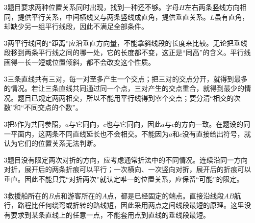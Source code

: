 \documentclass[multi=snippet,border={5bp 20bp 5bp 5bp}]{standalone}
\newenvironment{snippet}[3]{\begin{minipage}{#1bp}\color{answerred}\fontsize{#2}{#3}\selectfont\raggedright}{\end{minipage}}
\begin{document}
\begin{snippet}{505}{11.5}{14}\begin{multicols}{3}\raggedcolumns 题目要求两种位置关系同时出现，找到一种还不够。字母\(H\)\allowbreak 左右两条竖线方向相同，提供平行关系，中间横线又与两条竖线成直角，提供垂直关系。\(L\)\allowbreak 虽有直角，却缺少另一组平行线段，因此不满足全部条件。\end{multicols}\end{snippet}
\begin{snippet}{505}{11.5}{14}\begin{multicols}{3}\raggedcolumns 两平行线间的“距离”应沿垂直方向量，不能拿斜线段的长度来比较。无论把垂线段移到两条平行线之间的哪一处，它的长度都不变，这正是“同高”的含义。平行线画得一长一短或位置倾斜，都不会改变这个性质。\end{multicols}\end{snippet}
\begin{snippet}{505}{11.5}{14}\begin{multicols}{3}\raggedcolumns 三条直线共有三对，每一对至多产生一个交点；把三对的交点分开，就得到最多的情况。若让三条直线共同通过同一个点，三对产生的交点重合，就得到最少的情况。题目已规定两两相交，所以不能用平行线得到零个交点；要分清“相交的次数”和“不同交点的个数”。\end{multicols}\end{snippet}
\begin{snippet}{505}{11.5}{14}\begin{multicols}{3}\raggedcolumns 把\(b\)\allowbreak 作为共同参照，\(a\)\allowbreak 与它同向，\(c\)\allowbreak 也与它同向，因此\(a\)\allowbreak 与\(c\)\allowbreak 的方向一致。在题设的同一平面内，这两条不同直线延长也不会相交。不能因为\(a\)\allowbreak 和\(c\)\allowbreak 没有直接给出符号，就认为它们的位置关系无法判断。\end{multicols}\end{snippet}
\begin{snippet}{505}{11.5}{14}\begin{multicols}{3}\raggedcolumns 题目没有限定两次对折的方向，应考虑通常折法中的不同情况。连续沿同一方向对折，展开后的两条折痕可以平行；一次横向、一次竖向对折，展开后的折痕可以垂直。因此不能只凭“对折两次”就认定唯一的位置关系，应保留“可能”的限定。\end{multicols}\end{snippet}
\begin{snippet}{505}{11.5}{14}\begin{multicols}{3}\raggedcolumns 救援船所在的\(B\)\allowbreak 点和游客所在的\(A\)\allowbreak 点，都是已经固定的端点。直接沿线段\(AB\)\allowbreak 航行，路程比任何绕弯或折转的路线短，因此采用两点之间线段最短的原理。这里没有要求到某条直线上的任意一点，不能套用点到直线的垂线段最短。\end{multicols}\end{snippet}
\end{document}
